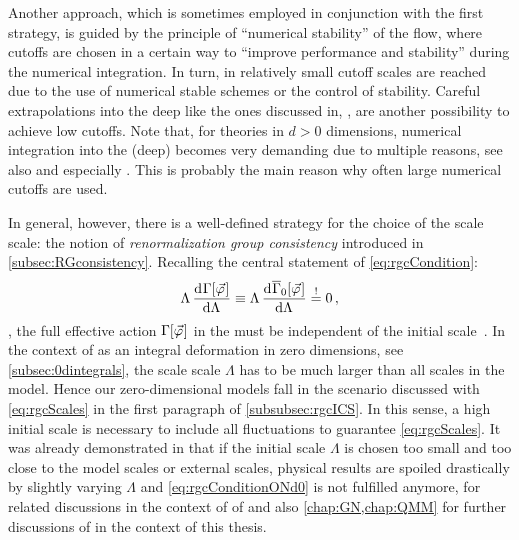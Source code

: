 Another approach, which is sometimes employed in conjunction with the first strategy, is guided by the principle of ``numerical stability'' of the \frg{} flow, where cutoffs are chosen in a certain way to ``improve performance and stability'' during the numerical \rgtime{} integration.
In turn, in  relatively small \ir{} cutoff scales are reached due to the use of numerical stable schemes or the control of stability.
Careful extrapolations into the deep \ir{} like the ones discussed in, \eg{},  are another possibility to achieve low \ir{} cutoffs.
Note that, for theories in $d>0$ dimensions, numerical integration into the (deep) \ir{} becomes very demanding due to multiple reasons, see also  and especially .
This is probably the main reason why often large numerical \ir{} cutoffs are used.

In general, however, there is a well-defined strategy for the choice of the \uv{} scale scale: the notion of \textit{renormalization group consistency} introduced in \cref{subsec:RGconsistency}.
Recalling the central statement of \cref{eq:rgcCondition}: 
\begin{align}
	\Lambda\dod{\Gamma[\vec{\varphi}\vts]}{\Lambda}\equiv \Lambda\dod{\FSeaa_0[\vec{\varphi}\vts]}{\Lambda}\overset{!}{=} 0\,,\label{eq:rgcConditionONd0}
\end{align}
\ie{}, the full effective action $\Gamma [\vec{\varphi}\mskip1.0mu]$ in the \ir{} must be independent of the \uv{} initial scale~\cite{Braun:2018svj}.
In the context of \frg{} as an integral deformation in zero dimensions, see \cref{subsec:0dintegrals}, the \uv{} scale scale $\Lambda$ has to be much larger than all scales in the model.
Hence our zero-dimensional models fall in the scenario discussed with \cref{eq:rgcScales} in the first paragraph of \cref{subsubsec:rgcICS}.
In this sense, a high \uv{} initial scale is necessary to include all fluctuations \dash{} to guarantee \cref{eq:rgcScales}.
It was already demonstrated in  that if the \uv{} initial scale $\Lambda$ is chosen too small and too close to the model scales or external scales, physical results are spoiled drastically by slightly varying $\Lambda$ and \cref{eq:rgcConditionONd0} is not fulfilled anymore, \cf{}  for related discussions in the context of \loefts{} of \qcd{} and also \cref{chap:GN,chap:QMM} for further discussions of \rgcy{} in the context of this thesis.

